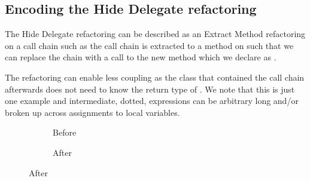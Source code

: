 \subsection{Encoding the Hide Delegate refactoring}\label{sec:hideDelegate}

The Hide Delegate refactoring can be described as an Extract Method refactoring on a call chain such as 
the call chain is extracted to a method on  such that we can replace the chain with a call to the new method 
which we declare as .

The refactoring can enable less coupling as the class that contained the call chain afterwards does not need to know the return type of .
We note that this is just one example and intermediate, dotted, expressions can be arbitrary long and/or broken up across assignments to local variables.



\begin{figure}
  \centering
  \begin{subfigure}[b]{.455\linewidth}
    
    \caption{Before}
    \label{lst:HideDelegate-nofields-before-refinity}
  \end{subfigure}\hspace{1cm}
  \begin{subfigure}[b]{.455\linewidth}
    
    \caption{After}
    \label{lst:HideDelegate-nofields-after-refinity}
  \end{subfigure}
\label{lst:HideDelegate-nofields-refinity}
\end{figure}

